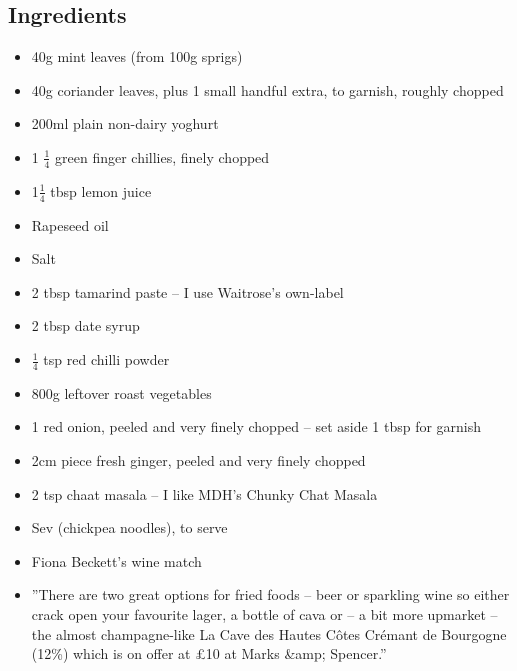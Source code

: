 \documentclass{book}
\begin{document}
\subsection*{Ingredients}
\begin{itemize}
\item 40g mint leaves (from 100g sprigs)
\item 40g coriander leaves, plus 1 small handful extra, to garnish, roughly chopped
\item 200ml plain non-dairy yoghurt
\item 1 $\frac{1}{4}$ green finger chillies, finely chopped
\item 1$\frac{1}{4}$ tbsp lemon juice
\item Rapeseed oil
\item Salt
\item 2 tbsp tamarind paste – I use Waitrose’s own-label
\item 2 tbsp date syrup
\item $\frac{1}{4}$ tsp red chilli powder
\item 800g leftover roast vegetables 
\item 1 red onion, peeled and very finely chopped – set aside 1 tbsp for garnish
\item 2cm piece fresh ginger, peeled and very finely chopped
\item 2 tsp chaat masala – I like MDH’s Chunky Chat Masala
\item Sev (chickpea noodles), to serve
\end{itemize}

\begin{itemize}
\item Fiona Beckett’s wine match
\item ”There are two great options for fried foods – beer or sparkling wine so either crack open your favourite lager, a bottle of cava or – a bit more upmarket – the almost champagne-like La Cave des Hautes Côtes Crémant de Bourgogne (12\%) which is on offer at £10 at Marks &amp; Spencer.”
\end{itemize}
\end{document}

